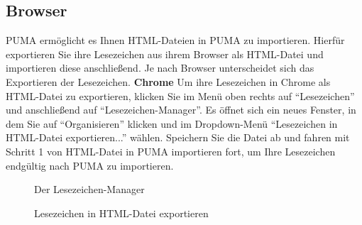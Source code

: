 \subsection{Browser}
\label{subsec:browser}
PUMA ermöglicht es Ihnen HTML-Dateien in PUMA zu importieren. Hierfür exportieren Sie ihre Lesezeichen aus ihrem Browser als HTML-Datei und importieren diese anschließend. Je nach Browser unterscheidet sich das Exportieren der Lesezeichen.
\newline
\newline
\textbf{Chrome}%
\newline Um ihre Lesezeichen in Chrome als HTML-Datei zu exportieren, klicken Sie im Menü oben rechts auf \enquote{Lesezeichen} und anschließend auf \enquote{Lesezeichen-Manager}. Es öffnet sich ein neues Fenster, in dem Sie auf \enquote{Organisieren} klicken und im Dropdown-Menü \enquote{Lesezeichen in HTML-Datei exportieren...} wählen. Speichern Sie die Datei ab und fahren mit Schritt 1 von HTML-Datei in PUMA importieren fort, um Ihre Lesezeichen endgültig nach PUMA zu importieren.  
\begin{figure}[h!]
 \centering
 \caption{Der Lesezeichen-Manager}
 \label{fig:lesezeichenManager}
\end{figure}
\begin{figure}[ht]
 \centering
 \caption{Lesezeichen in HTML-Datei exportieren}
 \label{fig:lesezeichenHtmlExportieren}
\end{figure}

